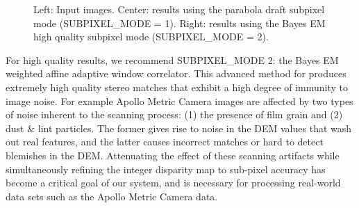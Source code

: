 \begin{figure}[tb]

\caption{Left: Input images.  Center: results using the parabola draft
  subpixel mode (SUBPIXEL\_MODE = 1). Right: results using the Bayes
  EM high quality subpixel mode (SUBPIXEL\_MODE = 2).}
\label{fig:parabola_results}
\end{figure}

For high quality results, we recommend SUBPIXEL\_MODE 2: the Bayes EM
weighted affine adaptive window correlator.  This advanced method for
produces extremely high quality stereo matches that exhibit a high
degree of immunity to image noise.  For example Apollo Metric Camera
images are affected by two types of noise inherent to the scanning
process: (1) the presence of film grain and (2) dust \& lint
particles.  The former gives rise to noise in the DEM values that wash
out real features, and the latter causes incorrect matches or hard to
detect blemishes in the DEM.  Attenuating the effect of these scanning
artifacts while simultaneously refining the integer disparity map to
sub-pixel accuracy has become a critical goal of our system, and is
necessary for processing real-world data sets such as the Apollo
Metric Camera data.

